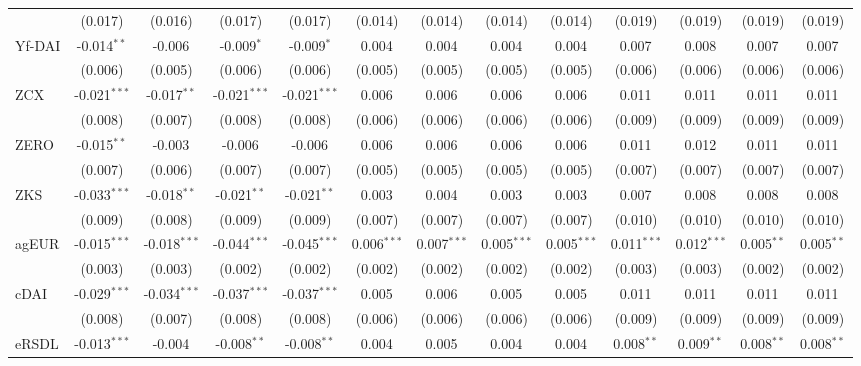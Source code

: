 \begin{table}[!htbp]
\begin{tabular}{@{\extracolsep{5pt}}lcccccccccccc}
  & (0.017) & (0.016) & (0.017) & (0.017) & (0.014) & (0.014) & (0.014) & (0.014) & (0.019) & (0.019) & (0.019) & (0.019) \\
 Yf-DAI & -0.014$^{**}$ & -0.006$^{}$ & -0.009$^{*}$ & -0.009$^{*}$ & 0.004$^{}$ & 0.004$^{}$ & 0.004$^{}$ & 0.004$^{}$ & 0.007$^{}$ & 0.008$^{}$ & 0.007$^{}$ & 0.007$^{}$ \\
  & (0.006) & (0.005) & (0.006) & (0.006) & (0.005) & (0.005) & (0.005) & (0.005) & (0.006) & (0.006) & (0.006) & (0.006) \\
 ZCX & -0.021$^{***}$ & -0.017$^{**}$ & -0.021$^{***}$ & -0.021$^{***}$ & 0.006$^{}$ & 0.006$^{}$ & 0.006$^{}$ & 0.006$^{}$ & 0.011$^{}$ & 0.011$^{}$ & 0.011$^{}$ & 0.011$^{}$ \\
  & (0.008) & (0.007) & (0.008) & (0.008) & (0.006) & (0.006) & (0.006) & (0.006) & (0.009) & (0.009) & (0.009) & (0.009) \\
 ZERO & -0.015$^{**}$ & -0.003$^{}$ & -0.006$^{}$ & -0.006$^{}$ & 0.006$^{}$ & 0.006$^{}$ & 0.006$^{}$ & 0.006$^{}$ & 0.011$^{}$ & 0.012$^{}$ & 0.011$^{}$ & 0.011$^{}$ \\
  & (0.007) & (0.006) & (0.007) & (0.007) & (0.005) & (0.005) & (0.005) & (0.005) & (0.007) & (0.007) & (0.007) & (0.007) \\
 ZKS & -0.033$^{***}$ & -0.018$^{**}$ & -0.021$^{**}$ & -0.021$^{**}$ & 0.003$^{}$ & 0.004$^{}$ & 0.003$^{}$ & 0.003$^{}$ & 0.007$^{}$ & 0.008$^{}$ & 0.008$^{}$ & 0.008$^{}$ \\
  & (0.009) & (0.008) & (0.009) & (0.009) & (0.007) & (0.007) & (0.007) & (0.007) & (0.010) & (0.010) & (0.010) & (0.010) \\
 agEUR & -0.015$^{***}$ & -0.018$^{***}$ & -0.044$^{***}$ & -0.045$^{***}$ & 0.006$^{***}$ & 0.007$^{***}$ & 0.005$^{***}$ & 0.005$^{***}$ & 0.011$^{***}$ & 0.012$^{***}$ & 0.005$^{**}$ & 0.005$^{**}$ \\
  & (0.003) & (0.003) & (0.002) & (0.002) & (0.002) & (0.002) & (0.002) & (0.002) & (0.003) & (0.003) & (0.002) & (0.002) \\
 cDAI & -0.029$^{***}$ & -0.034$^{***}$ & -0.037$^{***}$ & -0.037$^{***}$ & 0.005$^{}$ & 0.006$^{}$ & 0.005$^{}$ & 0.005$^{}$ & 0.011$^{}$ & 0.011$^{}$ & 0.011$^{}$ & 0.011$^{}$ \\
  & (0.008) & (0.007) & (0.008) & (0.008) & (0.006) & (0.006) & (0.006) & (0.006) & (0.009) & (0.009) & (0.009) & (0.009) \\
 eRSDL & -0.013$^{***}$ & -0.004$^{}$ & -0.008$^{**}$ & -0.008$^{**}$ & 0.004$^{}$ & 0.005$^{}$ & 0.004$^{}$ & 0.004$^{}$ & 0.008$^{**}$ & 0.009$^{**}$ & 0.008$^{**}$ & 0.008$^{**}$ \\

\end{tabular}
\end{table}

